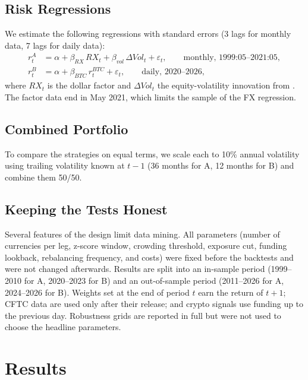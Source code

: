 \documentclass[11pt]{article}
\begin{document}
\subsection{Risk Regressions}\label{sec:methrisk}

We estimate the following regressions with \citet{NeweyWest1987} standard errors (3 lags for monthly data, 7 lags for daily data):
\begin{align}
r^{A}_{t} &= \alpha + \beta_{RX}\, RX_t + \beta_{vol}\,\Delta Vol_t + \varepsilon_t, \qquad \text{monthly, 1999:05--2021:05},\\
r^{B}_{t} &= \alpha + \beta_{BTC}\, r^{BTC}_t + \varepsilon_t, \qquad \text{daily, 2020--2026},
\end{align}
where $RX_t$ is the dollar factor and $\Delta Vol_t$ the equity-volatility innovation from \citet{LRV2011}. The factor data end in May 2021, which limits the sample of the FX regression.

\subsection{Combined Portfolio}\label{sec:methcomb}

To compare the strategies on equal terms, we scale each to 10\% annual volatility using trailing volatility known at $t-1$ (36 months for A, 12 months for B) and combine them 50/50.

\subsection{Keeping the Tests Honest}\label{sec:methhonest}

Several features of the design limit data mining. All parameters (number of currencies per leg, z-score window, crowding threshold, exposure cut, funding lookback, rebalancing frequency, and costs) were fixed before the backtests and were not changed afterwards. Results are split into an in-sample period (1999--2010 for A, 2020--2023 for B) and an out-of-sample period (2011--2026 for A, 2024--2026 for B). Weights set at the end of period $t$ earn the return of $t+1$; CFTC data are used only after their release; and crypto signals use funding up to the previous day. Robustness grids are reported in full but were not used to choose the headline parameters.

\section{Results}\label{sec:results}
\end{document}
